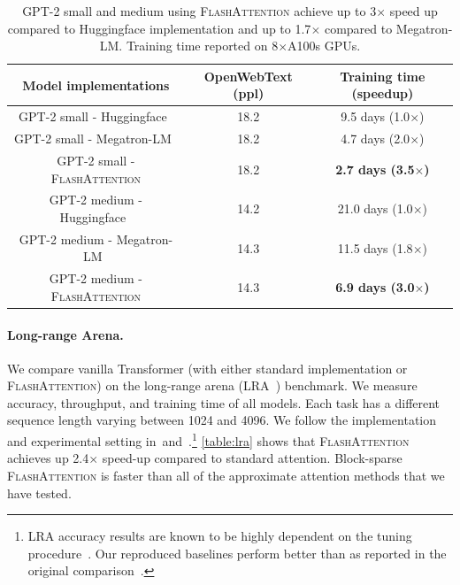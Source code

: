\documentclass{article}
\newcommand{\sysname}{\textsc{FlashAttention}\xspace}
\begin{document}
\begin{table}[h]
  \captionsetup{font=small}
  \small
  \centering
  \vspace{-1em}
  \caption{\label{table:gpt_finetune}GPT-2 small and medium using \sysname achieve up to 3$\times$ speed up compared to
    Huggingface implementation and up to 1.7$\times$ compared to Megatron-LM.
    Training time reported on 8$\times$A100s GPUs.}
  \setlength{\tabcolsep}{5pt}
  \iftoggle{arxiv}{}{
      \resizebox{0.8\linewidth}{!}
  }
  {
    \begin{tabular}{@{}c|cc@{}}
      Model implementations &OpenWebText (ppl)& Training time (speedup) \\
      \hline
      GPT-2 small - Huggingface~\citep{wolf-etal-2020-transformers} & 18.2 & 9.5 days (1.0$\times$) \\
      GPT-2 small - Megatron-LM~\citep{shoeybi2019megatron} & 18.2 & 4.7 days (2.0$\times$) \\
      GPT-2 small - \sysname & 18.2 & \textbf{2.7 days (3.5$\times$)} \\ \hline
      GPT-2 medium - Huggingface~\citep{wolf-etal-2020-transformers} & 14.2 & 21.0 days (1.0$\times$) \\
      GPT-2 medium - Megatron-LM~\citep{shoeybi2019megatron} & 14.3 & 11.5 days (1.8$\times$) \\
      GPT-2 medium - \sysname & 14.3 & \textbf{6.9 days (3.0$\times$)} \\
      
    \end{tabular}
  }
  \vspace{-1.5em}
\end{table}

\paragraph{Long-range Arena.}
We compare vanilla Transformer (with either standard implementation or \sysname)
on the long-range arena (LRA~\citep{tay2020long}) benchmark.
We measure accuracy, throughput, and training time of all models.
Each task has a different sequence length varying between 1024 and 4096.
We follow the implementation and experimental setting
in~\citet{tay2020long}and~\citet{xiong2021nystromformer}.\footnote{LRA accuracy
  results are known to be highly dependent on the tuning
  procedure~\citep{xiong2021nystromformer}.
  Our reproduced baselines perform better than as reported in the original
  comparison~\citep{tay2020long}.}
\cref{table:lra} shows that \sysname achieves up 2.4$\times$
speed-up compared to standard attention.
Block-sparse \sysname is faster than all of the approximate attention methods that we have
tested.
\end{document}

